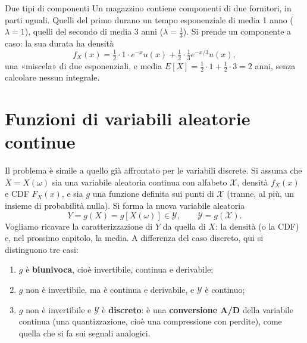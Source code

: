 \begin{esempio}{Due tipi di componenti}
Un magazzino contiene componenti di due fornitori, in parti uguali. Quelli del primo durano un tempo esponenziale di
media 1 anno ($\lambda = 1$), quelli del secondo di media 3 anni ($\lambda = \frac13$). Si prende un componente a caso:
la sua durata ha densità
\[ f_X(x) = \tfrac12 \cdot 1 \cdot e^{-x} u(x) + \tfrac12 \cdot \tfrac13 e^{-x/3} u(x) , \]
una «miscela» di due esponenziali, e media $E[X] = \frac12 \cdot 1 + \frac12 \cdot 3 = 2$ anni, senza calcolare nessun
integrale.
\end{esempio}

\section{Funzioni di variabili aleatorie continue}

Il problema è simile a quello già affrontato per le variabili discrete. Si assuma che $X = X(\omega)$ sia una variabile
aleatoria continua con alfabeto $\mathcal{X}$, densità $f_X(x)$ e CDF $F_X(x)$, e sia $g$ una funzione definita sui
punti di $\mathcal{X}$ (tranne, al più, un insieme di probabilità nulla). Si forma la nuova variabile aleatoria
\[ Y = g(X) = g[X(\omega)] \in \mathcal{Y} , \qquad \mathcal{Y} = g(\mathcal{X}) . \]
Vogliamo ricavare la caratterizzazione di $Y$ da quella di $X$: la densità (o la CDF) e, nel prossimo capitolo, la
media. A differenza del caso discreto, qui si distinguono tre casi:
\begin{enumerate}[label=\alph*)]
  \item $g$ è \textbf{biunivoca}, cioè invertibile, continua e derivabile;
  \item $g$ non è invertibile, ma è continua e derivabile, e $\mathcal{Y}$ è continuo;
  \item $g$ non è invertibile e $\mathcal{Y}$ è \textbf{discreto}: è una \textbf{conversione A/D} della variabile
        continua (una quantizzazione, cioè una compressione con perdite), come quella che si fa sui segnali
        analogici.
\end{enumerate}

